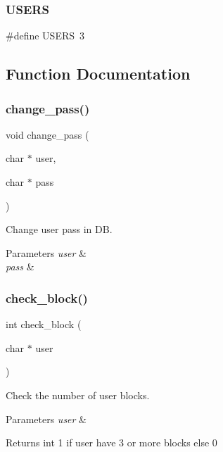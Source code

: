 \mbox{\label{auth_8h_a322789c10f93ef5e09a1d5f17aabf0e3}} 
\subsubsection{U\+S\+E\+RS}
{\footnotesize\ttfamily \#define U\+S\+E\+RS~3}



\subsection{Function Documentation}
\mbox{\label{auth_8h_a97aeb8e1fb29fa958c8ea862bda5ba69}} 
\subsubsection{change\+\_\+pass()}
{\footnotesize\ttfamily void change\+\_\+pass (\begin{DoxyParamCaption}\item[{char $\ast$}]{user,  }\item[{char $\ast$}]{pass }\end{DoxyParamCaption})}



Change user pass in DB. 


\begin{DoxyParams}{Parameters}
{\em user} & \\
\hline
{\em pass} & \\
\hline
\end{DoxyParams}
\mbox{\label{auth_8h_a3bf3271f2878741a36a522714fc1180b}} 
\subsubsection{check\+\_\+block()}
{\footnotesize\ttfamily int check\+\_\+block (\begin{DoxyParamCaption}\item[{char $\ast$}]{user }\end{DoxyParamCaption})}



Check the number of user blocks. 


\begin{DoxyParams}{Parameters}
{\em user} & \\
\hline
\end{DoxyParams}
\begin{DoxyReturn}{Returns}
int 1 if user have 3 or more blocks else 0 
\end{DoxyReturn}
\mbox{\label{auth_8h_ac577f045e4bf8abe2128eb727bf5edb7}} 
